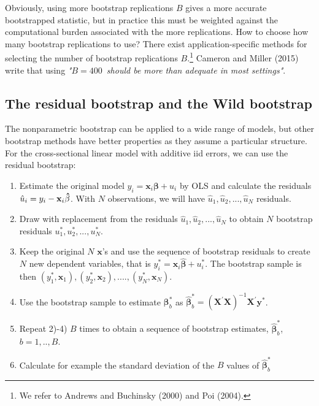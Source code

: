 \documentclass{article}
\begin{document}
Obviously, using more bootstrap replications $B$ gives a more accurate
bootstrapped statistic, but in practice this must be weighted against the
computational burden associated with the more replications. How to choose
how many bootstrap replications to use? There exist application-specific
methods for selecting the number of bootstrap replications $B$.\footnote{%
We refer to Andrews and Buchinsky (2000) and Poi (2004).} Cameron and Miller
(2015) write that using \emph{"}$B=400$\emph{\ should be more than adequate
in most settings"}.

\subsection{The residual bootstrap and the Wild bootstrap}

The nonparametric bootstrap can be applied to a wide range of models, but
other bootstrap methods have better properties as they assume a particular
structure. For the cross-sectional linear model with additive iid errors, we
can use the residual bootstrap:

\begin{enumerate}
\item Estimate the original model $y_{i}=\mathbf{x}_{i}\mathbf{\beta }+u_{i}$
by OLS and calculate the residuals $\hat{u}_{i}=y_{i}-\mathbf{x}_{i}\mathbf{%
\hat{\beta}}$. With $N$ observations, we will have $\hat{u}_{1},\hat{u}%
_{2},...,\hat{u}_{N}$ residuals.

\item Draw with replacement from the residuals $\hat{u}_{1},\hat{u}_{2},...,%
\hat{u}_{N}$ to obtain $N$ bootstrap residuals $u_{1}^{\ast },u_{2}^{\ast
},...,u_{N}^{\ast }$.

\item Keep the original $N$ $\mathbf{x}$'s and use the sequence of bootstrap
residuals to create $N$ new dependent variables, that is $y_{i}^{\ast }=%
\mathbf{x}_{i}\mathbf{\hat{\beta}}+u_{i}^{\ast }$. The bootstrap sample is
then $\left( y_{1}^{\ast },\mathbf{x}_{1}\right) ,\left( y_{2}^{\ast },%
\mathbf{x}_{2}\right) ,....,\left( y_{N}^{\ast },\mathbf{x}_{N}\right) $.

\item Use the bootstrap sample to estimate $\mathbf{\beta }_{b}^{\ast }$ as $%
\mathbf{\hat{\beta}}_{b}^{\ast }=\left( \mathbf{X}^{\prime }\mathbf{X}%
\right) ^{-1}\mathbf{X}^{\prime }\mathbf{y}^{\ast }$.

\item Repeat 2)-4) $B$ times to obtain a sequence of bootstrap estimates, $%
\mathbf{\hat{\beta}}_{b}^{\ast }$, $b=1,..,B$.

\item Calculate for example the standard deviation of the $B$ values of $%
\mathbf{\hat{\beta}}_{b}^{\ast }$
\end{enumerate}
\end{document}
